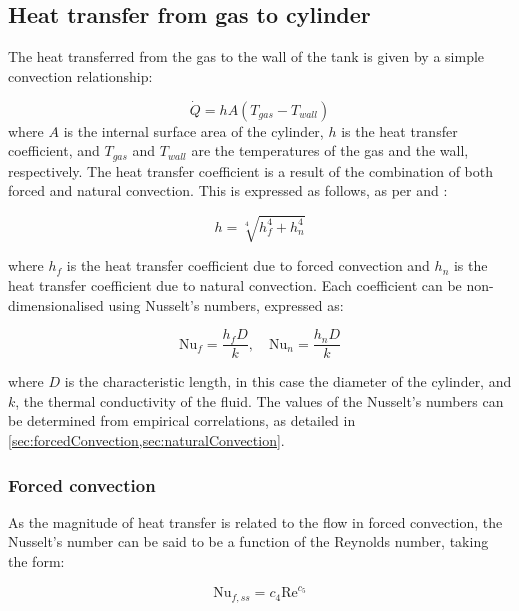 

\subsection{Heat transfer from gas to cylinder}

The heat transferred from the gas to the wall of the tank is given by a simple convection relationship:

\begin{equation}
\label{equ:convection}
\dot Q = h A \left( T_{gas} - T_{wall}\right)
\end{equation}
where $A$ is the internal surface area of the cylinder, $h$ is the heat transfer coefficient, and $T_{gas}$ and $T_{wall}$ are the temperatures of the gas and the wall, respectively. The heat transfer coefficient is a result of the combination of both forced and natural convection. This is expressed as follows, as per \cite{Incropera2007} and \cite{Kakac1987}:

\begin{equation}
h = \sqrt[4]{h_f^4 + h_n^4} 
\end{equation}

\noindent where $h_f$ is the heat transfer coefficient due to forced convection and $h_n$ is the heat transfer coefficient due to natural convection. Each coefficient can be non-dimensionalised using Nusselt's numbers, expressed as:

\begin{equation}
\text{Nu}_f = \frac{h_f D}{k}, \quad \text{Nu}_n = \frac{h_n D}{k}
\end{equation}

\noindent where $D$ is the characteristic length, in this case the diameter of the cylinder, and $k$, the thermal conductivity of the fluid. The values of the Nusselt's numbers can be determined from empirical correlations, as detailed in \cref{sec:forcedConvection,sec:naturalConvection}.

\subsubsection{Forced convection}
\label{sec:forcedConvection}
As the magnitude of heat transfer is related to the flow in forced convection, the Nusselt's number can be said to be a function of the Reynolds number, taking the form:

\begin{equation}
\label{equ:nusseltReynolds}
\text{Nu}_{f,ss} = c_4 \text{Re} ^{c_5}
\end{equation}

